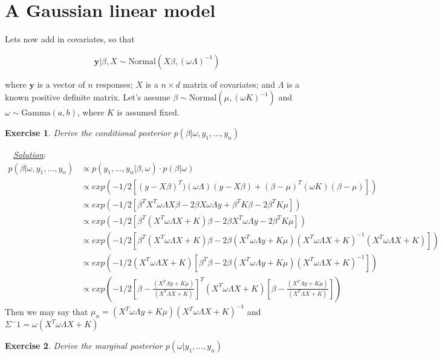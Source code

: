 \documentclass[twoside]{article}
\newcounter{lecnum}
\newtheorem{exercise}{Exercise}[lecnum]
\newenvironment{solution}{
  \begin{flushleft} \noindent ~~\underline{\emph{Solution}}: \rmfamily}{\end{flushleft}}
\begin{document}
\newpage
\section{A Gaussian linear model}
Lets now add in covariates, so that

$$\mathbf{y}|\beta, X \sim \mbox{Normal}(X\beta, (\omega \Lambda)^{-1})$$

where $\mathbf{y}$ is a vector of $n$ responses; $X$ is a $n\times d$ matrix of covariates; and $\Lambda$ is a known positive definite matrix.
Let's assume $\beta\sim \mbox{Normal}(\mu, (\omega K)^{-1})$ and $\omega \sim \mbox{Gamma}(a,b)$, where $K$ is assumed fixed.


\begin{exercise}
  Derive the conditional posterior $p(\beta|\omega, y_1,\dots, y_n)$
\end{exercise}
\begin{solution}
\begin{equation}
\begin{split}
p(\beta|\omega, y_1,\dots, y_n) & \propto p(y_1,\dots, y_n | \beta, \omega) \cdot p(\beta|\omega) 
\\ & \propto exp(-1/2[(y-X\beta)^T)(\omega \Lambda)(y-X\beta)+(\beta-\mu)^T(\omega K)(\beta-\mu)])
\\ & \propto exp(-1/2[\beta^TX^T\omega \Lambda X \beta -2 \beta X \omega \Lambda y +\beta^T K \beta -2\beta^T K \mu ])
\\ & \propto exp(-1/2[\beta^T (X^T\omega \Lambda X +K)\beta -2 \beta X^T \omega \Lambda y  -2\beta^T K \mu ])
\\ & \propto exp(-1/2[\beta^T (X^T\omega \Lambda X +K)\beta -2 \beta (X^T \omega \Lambda y  + K \mu)(X^T\omega \Lambda X +K)^{-1}(X^T\omega \Lambda X +K) ])
\\ & \propto exp(-1/2(X^T\omega \Lambda X +K)[\beta^T\beta -2 \beta (X^T \omega \Lambda y  + K \mu)(X^T\omega \Lambda X +K)^{-1} ])
\\ & \propto exp(-1/2[\beta - \frac{(X^T  \Lambda y  + K \mu)}{(X^T \Lambda X +K)}]^T(X^T\omega \Lambda X +K)[\beta - \frac{(X^T \Lambda y  + K \mu)}{(X^T\Lambda X +K)}])
\end{split}
\end{equation}
Then we may say that $\mu_n = (X^T \omega \Lambda y  + K \mu)(X^T\omega \Lambda X +K)^{-1} $ and $\Sigma^-1 = \omega(X^T\omega \Lambda X +K)$
\end{solution}

\begin{exercise}
  Derive the marginal posterior $p(\omega|y_1,\dots, y_n)$
\end{exercise}
\end{document}
